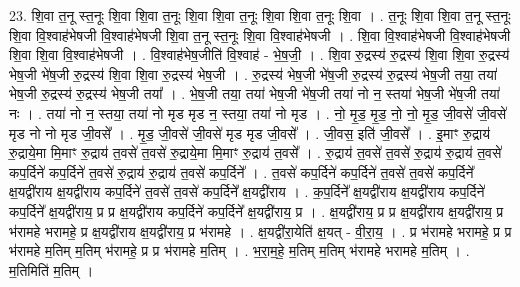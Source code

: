 \documentclass[17pt]{extarticle}
\begin{document}
23. शि॒वा त॒नू स्त॒नूः शि॒वा शि॒वा त॒नूः शि॒वा शि॒वा त॒नूः शि॒वा शि॒वा त॒नूः शि॒वा । . त॒नूः शि॒वा शि॒वा त॒नू स्त॒नूः शि॒वा वि॒श्वाह॑भेषजी वि॒श्वाह॑भेषजी शि॒वा त॒नू स्त॒नूः शि॒वा वि॒श्वाह॑भेषजी । . शि॒वा वि॒श्वाह॑भेषजी वि॒श्वाह॑भेषजी शि॒वा शि॒वा वि॒श्वाह॑भेषजी । . वि॒श्वाह॑भेष॒जीति॑ वि॒श्वाह॑ - भे॒ष॒जी॒ । . शि॒वा रु॒द्रस्य॑ रु॒द्रस्य॑ शि॒वा शि॒वा रु॒द्रस्य॑ भेष॒जी भे॑ष॒जी रु॒द्रस्य॑ शि॒वा शि॒वा रु॒द्रस्य॑ भेष॒जी । . रु॒द्रस्य॑ भेष॒जी भे॑ष॒जी रु॒द्रस्य॑ रु॒द्रस्य॑ भेष॒जी तया॒ तया॑ भेष॒जी रु॒द्रस्य॑ रु॒द्रस्य॑ भेष॒जी तया᳚ । . भे॒ष॒जी तया॒ तया॑ भेष॒जी भे॑ष॒जी तया॑ नो न॒ स्तया॑ भेष॒जी भे॑ष॒जी तया॑ नः । . तया॑ नो न॒ स्तया॒ तया॑ नो मृड मृड न॒ स्तया॒ तया॑ नो मृड । . नो॒ मृ॒ड॒ मृ॒ड॒ नो॒ नो॒ मृ॒ड॒ जी॒वसे॑ जी॒वसे॑ मृड नो नो मृड जी॒वसे᳚ । . मृ॒ड॒ जी॒वसे॑ जी॒वसे॑ मृड मृड जी॒वसे᳚ । . जी॒वस॒ इति॑ जी॒वसे᳚ । . इ॒माꣳ रु॒द्राय॑ रु॒द्राये॒मा मि॒माꣳ रु॒द्राय॑ त॒वसे॑ त॒वसे॑ रु॒द्राये॒मा मि॒माꣳ रु॒द्राय॑ त॒वसे᳚ । . रु॒द्राय॑ त॒वसे॑ त॒वसे॑ रु॒द्राय॑ रु॒द्राय॑ त॒वसे॑ कप॒र्दिने॑ कप॒र्दिने॑ त॒वसे॑ रु॒द्राय॑ रु॒द्राय॑ त॒वसे॑ कप॒र्दिने᳚ । . त॒वसे॑ कप॒र्दिने॑ कप॒र्दिने॑ त॒वसे॑ त॒वसे॑ कप॒र्दिने᳚ क्ष॒यद्वी॑राय क्ष॒यद्वी॑राय कप॒र्दिने॑ त॒वसे॑ त॒वसे॑ कप॒र्दिने᳚ क्ष॒यद्वी॑राय । . क॒प॒र्दिने᳚ क्ष॒यद्वी॑राय क्ष॒यद्वी॑राय कप॒र्दिने॑ कप॒र्दिने᳚ क्ष॒यद्वी॑राय॒ प्र प्र क्ष॒यद्वी॑राय कप॒र्दिने॑ कप॒र्दिने᳚ क्ष॒यद्वी॑राय॒ प्र । . क्ष॒यद्वी॑राय॒ प्र प्र क्ष॒यद्वी॑राय क्ष॒यद्वी॑राय॒ प्र भ॑रामहे भरामहे॒ प्र क्ष॒यद्वी॑राय क्ष॒यद्वी॑राय॒ प्र भ॑रामहे । . क्ष॒यद्वी॑रा॒येति॑ क्ष॒यत् - वी॒रा॒य॒ । . प्र भ॑रामहे भरामहे॒ प्र प्र भ॑रामहे म॒तिम् म॒तिम् भ॑रामहे॒ प्र प्र भ॑रामहे म॒तिम् । . भ॒रा॒म॒हे॒ म॒तिम् म॒तिम् भ॑रामहे भरामहे म॒तिम् । . म॒तिमिति॑ म॒तिम् । \newline
\end{document}
